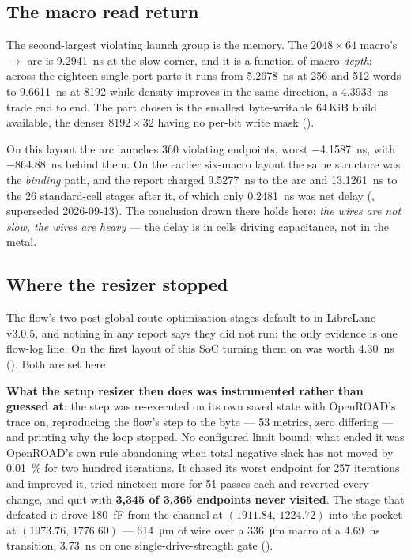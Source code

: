 \subsection{The macro read return}

The second-largest violating launch group is the memory. The
$2048\times64$ macro's $\rightarrow$ arc is
\qty{9.2941}{\nano\second} at the slow corner, and it is a function of
macro \emph{depth}: across the eighteen single-port parts it runs from
\qty{5.2678}{\nano\second} at 256 and 512 words to
\qty{9.6611}{\nano\second} at 8192 while density improves in the same
direction, a \qty{4.3933}{\nano\second} trade end to end. The part
chosen is the smallest byte-writable 64\,KiB build available, the
denser $8192\times32$ having no per-bit write mask
().

On this layout the arc launches 360 violating endpoints, worst
\qty{-4.1587}{\nano\second}, with \qty{-864.88}{\nano\second} behind
them. On the earlier six-macro layout the same structure was the
\emph{binding} path, and the report charged \qty{9.5277}{\nano\second}
to the arc and \qty{13.1261}{\nano\second} to the 26 standard-cell
stages after it, of which only \qty{0.2481}{\nano\second} was net delay
(, superseded 2026-09-13). The conclusion drawn
there holds here: \emph{the wires are not slow, the wires are heavy} ---
the delay is in cells driving capacitance, not in the metal.

\subsection{Where the resizer stopped}

The flow's two post-global-route optimisation stages default to
 in LibreLane v3.0.5, and nothing in any report says they
did not run: the only evidence is one flow-log line. On the first layout
of this SoC turning them on was worth \qty{4.30}{\nano\second}
(). Both are set here.

\textbf{What the setup resizer then does was instrumented rather than
guessed at}: the step was re-executed on its own saved state with
OpenROAD's  trace on, reproducing the flow's step to
the byte --- 53 metrics, zero differing --- and printing why the loop
stopped. No configured limit bound; what ended it was OpenROAD's own
rule abandoning  when total negative slack has not
moved by \qty{0.01}{\percent} for two hundred iterations. It chased its
worst endpoint for 257 iterations and improved it, tried nineteen more
for 51 passes each and reverted every change, and quit with
\textbf{3,345 of 3,365 endpoints never visited}. The stage that defeated
it drove \qty{180}{\femto\farad} from the channel at
$(1911.84,\,1224.72)$ into the pocket at $(1973.76,\,1776.60)$ ---
\qty{614}{\micro\metre} of wire over a \qty{336}{\micro\metre} macro at
a \qty{4.69}{\nano\second} transition, \qty{3.73}{\nano\second} on one
single-drive-strength gate ().

